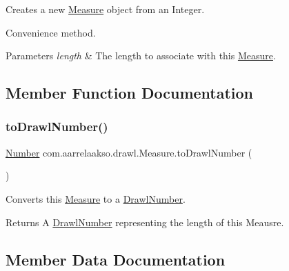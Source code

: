 Creates a new \hyperlink{classcom_1_1aarrelaakso_1_1drawl_1_1_measure}{Measure} object from an Integer. 

Convenience method.


\begin{DoxyParams}{Parameters}
{\em length} & The length to associate with this \hyperlink{classcom_1_1aarrelaakso_1_1drawl_1_1_measure}{Measure}. \\
\hline
\end{DoxyParams}


\subsection{Member Function Documentation}
\mbox{\label{classcom_1_1aarrelaakso_1_1drawl_1_1_measure_a6f01cfe45e01d43e89a73eaa17e3649f}} 
\subsubsection{\texorpdfstring{to\+Drawl\+Number()}{toDrawlNumber()}}
{\footnotesize\ttfamily \hyperlink{interfacecom_1_1aarrelaakso_1_1drawl_1_1_number}{Number} com.\+aarrelaakso.\+drawl.\+Measure.\+to\+Drawl\+Number (\begin{DoxyParamCaption}{ }\end{DoxyParamCaption})\hspace{0.3cm}{\ttfamily [protected]}}



Converts this \hyperlink{classcom_1_1aarrelaakso_1_1drawl_1_1_measure}{Measure} to a \hyperlink{classcom_1_1aarrelaakso_1_1drawl_1_1_drawl_number}{Drawl\+Number}. 

\begin{DoxyReturn}{Returns}
A \hyperlink{classcom_1_1aarrelaakso_1_1drawl_1_1_drawl_number}{Drawl\+Number} representing the length of this Meausre. 
\end{DoxyReturn}


\subsection{Member Data Documentation}
\mbox{\label{classcom_1_1aarrelaakso_1_1drawl_1_1_measure_aef040b9b0dd7d4a925448d0854c2444a}} 
